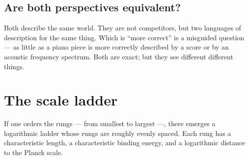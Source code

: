 \subsection*{Are both perspectives equivalent?}

Both describe the same world. They are not competitors, but two
languages of description for the same thing. Which is ``more
correct'' is a misguided question --- as little as a piano piece is
more correctly described by a score or by an acoustic frequency
spectrum. Both are exact; but they see different different things.

\section{The scale ladder}

If one orders the rungs --- from smallest to largest ---, there
emerges a logarithmic ladder whose rungs are roughly evenly spaced.
Each rung has a characteristic length, a characteristic binding
energy, and a logarithmic distance to the Planck scale.

\begin{center}
\small
{}
\end{center}

